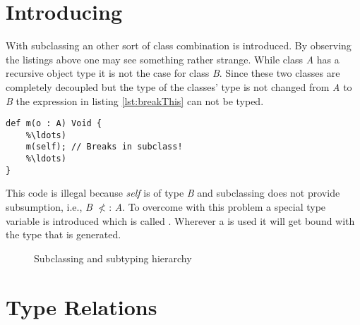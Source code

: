 
\section{Introducing \mytype}
With subclassing an other sort of class combination is introduced. By observing
the listings above one may see something rather strange. While class \emph{A}
has a recursive object type it is not the case for class \emph{B}. Since these
two classes are completely decoupled but the type of the classes' type is not changed
from \emph{A} to \emph{B} the expression in listing \ref{lst:breakThis} can not be typed.

\begin{lstlisting}[language=ooplss,caption=Illegal method m(o : \emph{A}) : \emph{Void} in class \emph{B},label=lst:subclassOf]
def m(o : A) Void {
	%\ldots)
	m(self); // Breaks in subclass!
	%\ldots)
}
\end{lstlisting}

This code is illegal because \emph{self} is of type \emph{B} and subclassing does not 
provide subsumption, i.e., \emph{B} $\nless$: \emph{A}. To overcome with this problem
a special type variable is introduced which is called \mytype. Wherever a \mytype is used
it will get bound with the type that is generated.

\begin{figure}[h]
	\centering
	\caption{Subclassing and subtyping hierarchy}
	\label{fig:hierarchy}
\end{figure}

\section{Type Relations}

